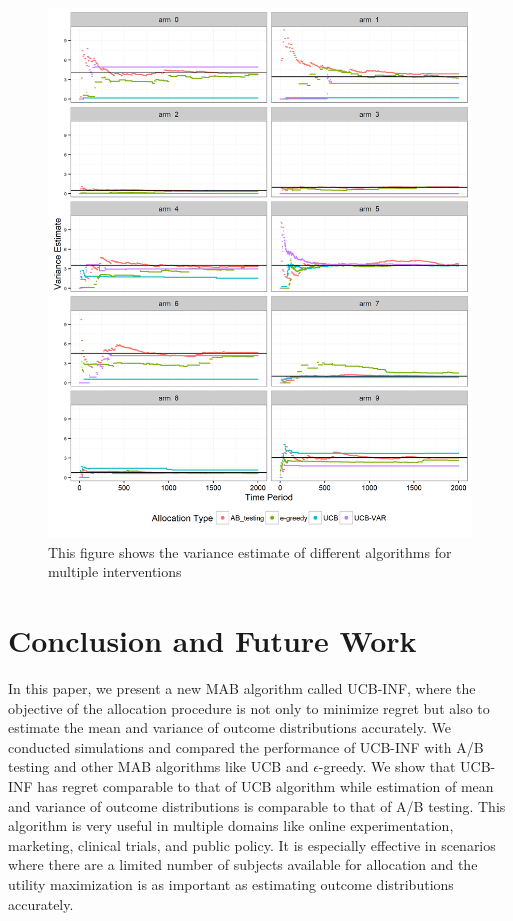 \documentclass[12pt, letterpaper]{article}
\begin{document}
\begin{figure}[]
  \centering
    \includegraphics[width=\textwidth]{figs/var.png}
      \caption{This figure shows the variance estimate of different algorithms for multiple interventions}
      \label{var}
\end{figure}




\section*{Conclusion and Future Work}

In this paper, we present a new MAB algorithm called UCB-INF, where the objective of the allocation procedure is not only to minimize regret but also to estimate the mean and variance of outcome distributions accurately. We conducted simulations and compared the performance of UCB-INF with A/B testing and other MAB algorithms like UCB and $\epsilon$-greedy. We show that UCB-INF has regret comparable to that of UCB algorithm while estimation of mean and variance of outcome distributions is comparable to that of A/B testing. This algorithm is very useful in multiple domains like online experimentation, marketing, clinical trials, and public policy. It is especially effective in scenarios where there are a limited number of subjects available for allocation and the utility maximization is as important as estimating outcome distributions accurately. 
\end{document}

